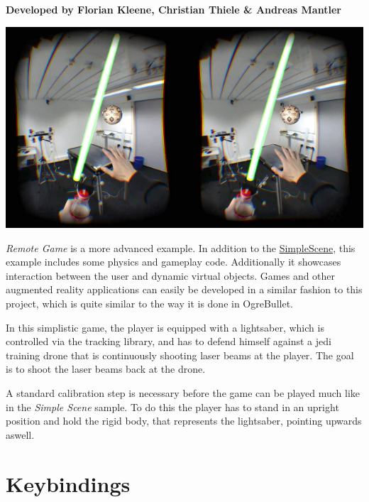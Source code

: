 \begin{center}
\textbf{Developed by Florian Kleene, Christian Thiele \& Andreas Mantler}
\end{center}

\includegraphics*[width=\textwidth]{RemoteGameThumb.png}

\emph{Remote Game} is a more advanced example. In addition to the \hyperref[simple_scene]{SimpleScene}, this example includes some physics and gameplay code. Additionally it showcases interaction between the user and dynamic virtual objects. Games and other augmented reality applications can easily be developed in a similar fashion to this project, which is quite similar to the way it is done in OgreBullet.

In this simplistic game, the player is equipped with a lightsaber, which is controlled via the tracking library, and has to defend himself against a jedi training drone that is continuously shooting laser beams at the player. The goal is to shoot the laser beams back at the drone. 

A standard calibration step is necessary before the game can be played much like in the \textit{Simple Scene} sample. To do this the player has to stand in an upright position and hold the rigid body, that represents the lightsaber, pointing upwards aswell. 



\section{Keybindings}\label{keybindings}

